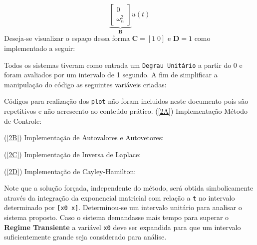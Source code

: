 \documentclass{article}
\begin{document}
\begin{resolution}
\begin{equation*}
        \underbrace{
        \begin{bmatrix}
            0\\
            \omega_{n}^{2}
        \end{bmatrix}
        }_{\boldsymbol{B}}
        u(t)
    \end{equation*}
    Deseja-se visualizar o espaço dessa forma $\boldsymbol{C} = [1\;0]$ e $\boldsymbol{D} = 1$ como implementado a seguir:
    \begin{scriptsize}
        \myOctave
    \end{scriptsize}
\newpage
    Todos os sistemas tiveram como entrada um \texttt{Degrau Unitário} a partir do 0 e foram avaliados por um intervalo de 1 segundo. A fim de simplificar a manipulação do código as seguintes variáveis criadas:
    \begin{scriptsize}
        \myOctave
    \end{scriptsize}
    Códigos para realização dos \texttt{plot} não foram incluidos neste documento pois são repetitivos e não acrescento ao conteúdo prático.
\newpage
    (\ref{2A}) Implementação Método de Controle:
    \begin{scriptsize}
        \myOctave
    \end{scriptsize}
    (\ref{2B}) Implementação de Autovalores e Autovetores:
    \begin{scriptsize}
        \myOctave
    \end{scriptsize}
    (\ref{2C}) Implementação de Inversa de Laplace:
    \begin{scriptsize}
        \myOctave
    \end{scriptsize}
\newpage
    (\ref{2D}) Implementação de Cayley-Hamilton:
    \begin{scriptsize}
        \myOctave
    \end{scriptsize}
    Note que a solução forçada, independente do método, será obtida simbolicamente através da integração da exponencial matricial com relação a \texttt{t} no intervalo determinado por \texttt{[x0 x]}.
\newpage
    Determinou-se um intervalo unitário para analisar o sistema proposto. Caso o sistema demandasse mais tempo para superar o \textbf{Regime Transiente} a variável \texttt{x0} deve ser expandida para que um intervalo suficientemente grande seja considerado para análise.

\end{resolution}
\end{document}
